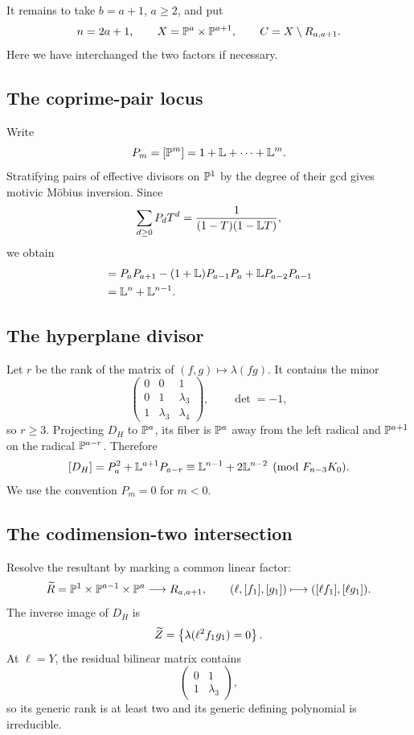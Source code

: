 \documentclass[11pt,reqno]{amsart}
\begin{document}
It remains to take \(b=a+1\), \(a\ge2\), and put
\[
n=2a+1,\qquad
X=\mathbb P^a\times\mathbb P^{a+1},\qquad
C=X\setminus R_{a,a+1}.
\]
Here we have interchanged the two factors if necessary.

\subsection{The coprime-pair locus}

Write
\[
P_m=[\mathbb P^m]=1+\mathbb L+\cdots+\mathbb L^m.
\]
Stratifying pairs of effective divisors on \(\mathbb P^1\) by the degree of their
gcd gives motivic M\"obius inversion.  Since
\[
\sum_{d\ge0}P_dT^d=\frac1{(1-T)(1-\mathbb L T)},
\]
we obtain
\begin{align}
[C]
&=P_aP_{a+1}-(1+\Lef)P_{a-1}P_a
+\Lef P_{a-2}P_{a-1}\notag\\
&=\Lef^n+\Lef^{n-1}.
\label{eq:coprime-class}
\end{align}

\subsection{The hyperplane divisor}

Let \(r\) be the rank of the matrix of
\((f,g)\mapsto\lambda(fg)\).  It contains the minor
\[
\begin{pmatrix}
0&0&1\\
0&1&\lambda_3\\
1&\lambda_3&\lambda_4
\end{pmatrix},
\qquad\det=-1,
\]
so \(r\ge3\).  Projecting \(D_H\) to \(\mathbb P^a\), its fiber is \(\mathbb P^a\)
away from the left radical and \(\mathbb P^{a+1}\) on the radical
\(\mathbb P^{a-r}\).  Therefore
\begin{equation}
\label{eq:DH-class}
[D_H]=P_a^2+\mathbb L^{a+1}P_{a-r}
\equiv
\mathbb L^{n-1}+2\mathbb L^{n-2}
\pmod{F_{n-3}K_0}.
\end{equation}
We use the convention \(P_m=0\) for \(m<0\).

\subsection{The codimension-two intersection}

Resolve the resultant by marking a common linear factor:
\[
\widetilde R=
\mathbb P^1\times\mathbb P^{a-1}\times\mathbb P^a
\longrightarrow R_{a,a+1},
\qquad
(\ell,[f_1],[g_1])\longmapsto([\ell f_1],[\ell g_1]).
\]
The inverse image of \(D_H\) is
\begin{equation}
\label{eq:Ztilde}
\widetilde Z=
\left\{\lambda(\ell^2f_1g_1)=0\right\}.
\end{equation}
At \(\ell=Y\), the residual bilinear matrix contains
\[
\begin{pmatrix}0&1\\1&\lambda_3\end{pmatrix},
\]
so its generic rank is at least two and its generic defining polynomial is
irreducible.
\end{document}
